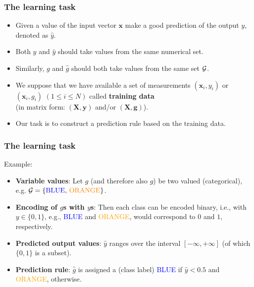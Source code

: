 \documentclass[notes]{beamer}          %
\newcommand{\vect}[1]{\bm{#1}}
\begin{document}
\begin{frame}
\frametitle{The learning task}
    \begin{itemize}
        \item Given a value of the input vector $\vect{x}$ make a good prediction of the output $y$, denoted as $\hat{y}$.
        \item Both $y$ and $\hat{y}$ should take values from the same numerical set.
        \item Similarly, $g$ and $\hat{g}$ should both take values from the same set $\cal{G}$.
         \item We suppose that we have available a set of measurements $(\vect{x}_i,y_i)$ or $(\vect{x}_i,g_i)$ $(1 \leq i \leq N)$ called {\bf training data} \\
         (in matrix form: $(\vect{X},\vect{y})$ and/or $(\vect{X},\vect{g})$).
        \item Our task is to construct a prediction rule based on the training data.

    \end{itemize}

\end{frame}


\begin{frame}
\frametitle{The learning task}
    Example:
    \begin{itemize}
         \item {\bf Variable values}: Let $g$ (and therefore also $\hat{g}$) be two valued (categorical), e.g. $\cal{G} = \{ \text{\textcolor{blue}{BLUE}, \textcolor{orange}{ORANGE}}\}$.
        \item {\bf Encoding of $g$s with $y$s}: Then each class can be encoded binary, i.e., with $y \in \{0,1\}$, e.g., \textcolor{blue}{BLUE} and \textcolor{orange}{ORANGE}, would correspond to $0$ and $1$, respectively.
        \item {\bf Predicted output values}: $\hat{y}$ ranges over the interval $[-\infty,+\infty]$ (of which $\{0,1\}$ is a subset).
        \item {\bf Prediction rule}: $\hat{g}$ is assigned a (class label) \textcolor{blue}{BLUE} if $\hat{y} < 0.5$ and \textcolor{orange}{ORANGE}, otherwise.

    \end{itemize}
\end{frame}
\end{document}

